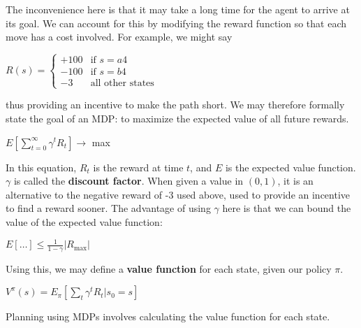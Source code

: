 \documentclass[10pt,a4paper]{article}
\begin{document}
The inconvenience here is that it may take a long time for the agent to arrive at its goal. We can account for this by modifying the reward function so that each move has a cost involved. For example, we might say
\begin{center}
$R(s) =
\begin{cases}
+100 & \text{if } s = a4 \\
-100 & \text{if } s = b4 \\
-3 & \text{all other states}
\end{cases}$
\end{center}
thus providing an incentive to make the path short. We may therefore formally state the goal of an MDP: to maximize the expected value of all future rewards.
\begin{center}
$\displaystyle E\left[\sum_{t=0}^{\infty} \gamma^t R_t \right] \rightarrow$ max
\end{center}
In this equation, $R_t$ is the reward at time $t$, and $E$ is the expected value function. $\gamma$ is called the \textbf{discount factor}. When given a value in $(0,1)$, it is an alternative to the negative reward of -3 used above, used to provide an incentive to find a reward sooner. The advantage of using $\gamma$ here is that we can bound the value of the expected value function:
\begin{center}
$\displaystyle E[\ldots] \leq \frac{1}{1-\gamma} |R_{\text{max}}|$
\end{center}

Using this, we may define a \textbf{value function} for each state, given our policy $\pi$.
\begin{center}
$\displaystyle V^\pi(s) = E_\pi \left[ \sum_t \gamma^t R_t | s_0 = s \right]$
\end{center}
Planning using MDPs involves calculating the value function for each state.
\end{document}
